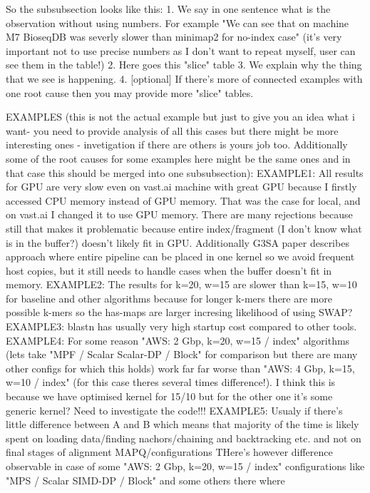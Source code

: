 So the subsubsection looks like this:
1. We say in one sentence what is the observation without using numbers. For example "We can see that on machine M7 BioseqDB was severly slower than minimap2 for no-index case" (it's very important not to use precise numbers as I don't want to repeat myself, user can see them in the table!)
2. Here goes this "slice" table
3. We explain why the thing that we see is happening.
4. [optional] If there's more of connected examples with one root cause then you may provide more "slice" tables.

EXAMPLES (this is not the actual example but just to give you an idea what i want-  you need to provide analysis of all this cases but there might be more interesting ones - invetigation if there are others is yours job too. Additionally some of the root causes for some examples here might be the same ones and in that case this should be merged into one subsubsection):
EXAMPLE1:
All results for GPU are very slow even on vast.ai machine with great GPU because I firstly accessed CPU memory instead of GPU memory. 
That was the case for local, and on vast.ai I changed it to use GPU memory.
There are many rejections because still that makes it problematic because entire index/fragment (I don't know what is in the buffer?) doesn't likely fit in GPU.
Additionally G3SA paper describes approach where entire pipeline can be placed in one kernel so we avoid frequent host copies, but it still needs to handle cases when the buffer doesn't fit in memory.
EXAMPLE2:
The results for k=20, w=15 are slower than k=15, w=10 for baseline and other algorithms because for longer k-mers there are more possible k-mers so the has-maps are larger incresing likelihood of using SWAP?
EXAMPLE3:
blastn has usually very high startup cost compared to other tools.
EXAMPLE4:
For some reason "AWS: 2 Gbp, k=20, w=15 / index" algorithms (lets take "MPF / Scalar Scalar-DP / Block" for comparison but there are many other configs for which this holds)
work far far worse than "AWS: 4 Gbp, k=15, w=10 / index" (for this case theres several times difference!). I think this is because we have optimised kernel for 15/10 but for the other one it's some generic kernel? Need to investigate the code!!!
EXAMPLE5:
Usualy if there's little difference between A and B which means that majority of the time is likely spent on loading data/finding nachors/chaining and backtracking etc. and not on final stages of alignment MAPQ/configurations
THere's however difference observable in case of some "AWS: 2 Gbp, k=20, w=15 / index" configurations like "MPS / Scalar SIMD-DP / Block" and some others there where
